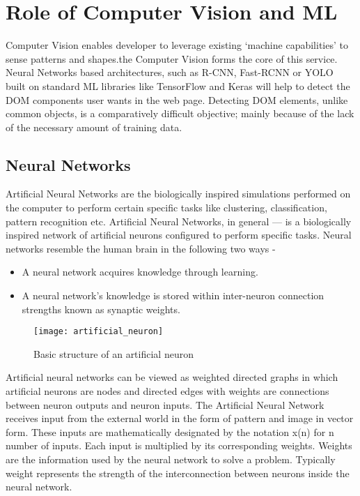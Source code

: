 \section{Role of Computer Vision and ML}
Computer Vision enables developer to leverage existing ‘machine capabilities’ to sense patterns and shapes.the
Computer Vision forms the core of this service. Neural Networks based architectures, such as R-CNN, Fast-RCNN or YOLO built on standard ML libraries like TensorFlow and Keras will help to detect the DOM components user wants in the web page. Detecting DOM elements, unlike common objects, is a comparatively difficult objective; mainly because of the lack of the necessary amount of training data.

	\subsection{Neural Networks}
	Artificial Neural Networks are the biologically inspired simulations performed on the computer to perform certain specific tasks like clustering, classification, pattern recognition etc. Artificial Neural Networks, in general — is a biologically inspired network of artificial neurons configured to perform specific tasks. Neural networks resemble the human brain in the following two ways -

	\begin{itemize}
		\item A neural network acquires knowledge through learning.
		\item A neural network’s knowledge is stored within inter-neuron connection strengths known as synaptic weights.
	\end{itemize}

	\begin{figure}[H]
		\centering
		\texttt{[image: artificial\_neuron]}
		\caption
		{Basic structure of an artificial neuron}
	\end{figure}

	Artificial neural networks can be viewed as weighted directed graphs in which artificial neurons are nodes and directed edges with weights are connections between neuron outputs and neuron inputs. The Artificial Neural Network receives input from the external world in the form of pattern and image in vector form. These inputs are mathematically designated by the notation x(n) for n number of inputs. Each input is multiplied by its corresponding weights. Weights are the information used by the neural network to solve a problem. Typically weight represents the strength of the interconnection between neurons inside the neural network.

